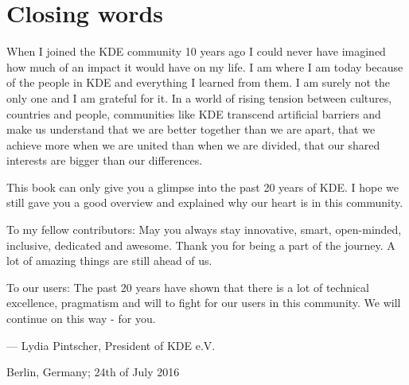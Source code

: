\chapter*{Closing words}

When I joined the KDE community 10 years ago I could never have imagined how much of an impact it would have on my life. I am where I am today because of the people in KDE and everything I learned from them. I am surely not the only one and I am grateful for it. In a world of rising tension between cultures, countries and people, communities like KDE transcend artificial barriers and make us understand that we are better together than we are apart, that we achieve more when we are united than when we are divided, that our shared interests are bigger than our differences.

This book can only give you a glimpse into the past 20 years of KDE. I hope we still gave you a good overview and explained why our heart is in this community.

To my fellow contributors: May you always stay innovative, smart, open-minded, inclusive, dedicated and awesome. Thank you for being a part of the journey. A lot of amazing things are still ahead of us.

To our users: The past 20 years have shown that there is a lot of technical excellence, pragmatism and will to fight for our users in this community. We will continue on this way - for you.

\begin{flushright}--- Lydia Pintscher, President of KDE e.V.\end{flushright}
\begin{flushright}Berlin, Germany; 24th of July 2016\end{flushright}

